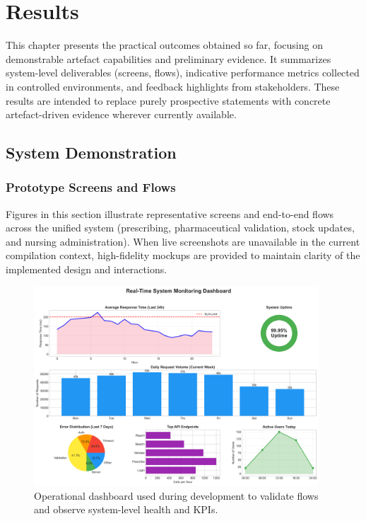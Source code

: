 \chapter{Results}
\label{chap:Results}

This chapter presents the practical outcomes obtained so far, focusing on demonstrable artefact capabilities and preliminary evidence. It summarizes system-level deliverables (screens, flows), indicative performance metrics collected in controlled environments, and feedback highlights from stakeholders. These results are intended to replace purely prospective statements with concrete artefact-driven evidence wherever currently available.

\section{System Demonstration}

\subsection{Prototype Screens and Flows}
Figures in this section illustrate representative screens and end-to-end flows across the unified system (prescribing, pharmaceutical validation, stock updates, and nursing administration). When live screenshots are unavailable in the current compilation context, high-fidelity mockups are provided to maintain clarity of the implemented design and interactions.

\begin{figure}[htbp]
    \centering
    \includegraphics[width=0.95\textwidth]{images/generated/monitoring_dashboard.png}
    \caption{Operational dashboard used during development to validate flows and observe system-level health and KPIs.}
    \label{fig:monitoring_dashboard}
\end{figure}

